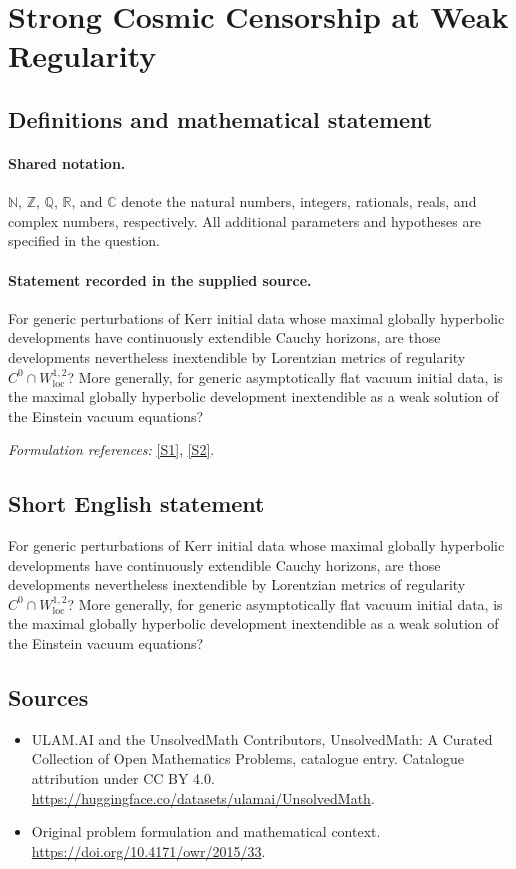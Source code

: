 \documentclass[11pt]{article}
\newcommand{\sref}[2]{\hyperlink{source:#1:#2}{[S#2]}}
\begin{document}
\section{Strong Cosmic Censorship at Weak Regularity}\label{statement}

\subsection{Definitions and mathematical statement}

\paragraph{Shared notation.}$\mathbb N$, $\mathbb Z$, $\mathbb Q$, $\mathbb R$, and $\mathbb C$ denote the natural numbers, integers, rationals, reals, and complex numbers, respectively. All additional parameters and hypotheses are specified in the question.


\paragraph{Statement recorded in the supplied source.}
For generic perturbations of Kerr initial data whose maximal globally hyperbolic developments have continuously extendible Cauchy horizons, are those developments nevertheless inextendible by Lorentzian metrics of regularity $C^0\cap W_{\mathrm{loc}}^{1,2}$? More generally, for generic asymptotically flat vacuum initial data, is the maximal globally hyperbolic development inextendible as a weak solution of the Einstein vacuum equations?
\par\smallskip\textit{Formulation references:} \sref{statement}{1}, \sref{statement}{2}.
\subsection{Short English statement}
For generic perturbations of Kerr initial data whose maximal globally hyperbolic developments have continuously extendible Cauchy horizons, are those developments nevertheless inextendible by Lorentzian metrics of regularity $C^0\cap W_{\mathrm{loc}}^{1,2}$? More generally, for generic asymptotically flat vacuum initial data, is the maximal globally hyperbolic development inextendible as a weak solution of the Einstein vacuum equations?
\subsection{Sources}
\begin{itemize}
\item[\hypertarget{source:statement:1}{S1}] ULAM.AI and the UnsolvedMath Contributors, UnsolvedMath: A Curated Collection of Open Mathematics Problems, catalogue entry. Catalogue attribution under CC BY 4.0.
\url{https://huggingface.co/datasets/ulamai/UnsolvedMath}.
\item[\hypertarget{source:statement:2}{S2}] Original problem formulation and mathematical context.
\url{https://doi.org/10.4171/owr/2015/33}.
\end{itemize}
\label{end:statement}
\end{document}
